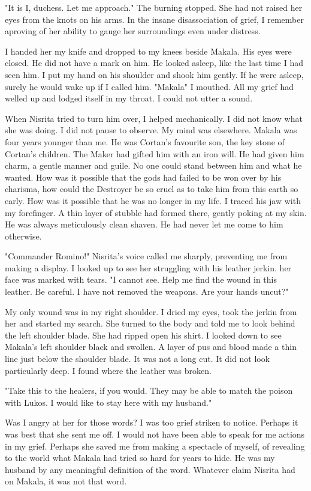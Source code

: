\documentclass{article}
\begin{document}
"It is I, duchess. Let me approach." The burning stopped. She had not raised her eyes from the knots on his arms. In the insane disassociation of grief, I remember aproving of her ability to gauge her surroundings even under distress. 

I handed her my knife and dropped to my knees beside Makala. His eyes were closed. He did not have a mark on him. He looked asleep, like the last time I had seen him. I put my hand on his shoulder and shook him gently. If he were asleep, surely he would wake up if I called him. "Makala" I mouthed. All my grief had welled up and lodged itself in my throat. I could not utter a sound. 

When Nisrita tried to turn him over, I helped mechanically. I did not know what she was doing. I did not pause to observe. My mind was elsewhere. Makala was four years younger than me. He was Cortan's favourite son, the key stone of Cortan's children. The Maker had gifted him with an iron will. He had given him charm, a gentle manner and guile. No one could stand between him and what he wanted. How was it possible that the gods had failed to be won over by his charisma, how could the Destroyer be so cruel as to take him from this earth so early. How was it possible that he was no longer in my life. 
I traced his jaw with my forefinger. A thin layer of stubble had formed there, gently poking at my skin. He was always meticulously clean shaven. He had never let me come to him otherwise.

"Commander Romino!" Nisrita's voice called me sharply, preventing me from making a display. I looked up to see her struggling with his leather jerkin. her face was marked with tears. "I cannot see. Help me find the wound in this leather. Be careful. I have not removed the weapons. Are your hands uncut?"

My only wound was in my right shoulder. I dried my eyes, took the jerkin from her and started my search. She turned to the body and told me to look behind the left shoulder blade. She had ripped open his shirt. I looked down to see Makala's left shoulder black and swollen. A layer of pus and blood made a thin line just below the shoulder blade. It was not a long cut. It did not look particularly deep. I found where the leather was broken. 

"Take this to the healers, if you would. They may be able to match the poison with Lukos. I would like to stay here with my husband."

Was I angry at her for those words? I was too grief striken to notice. Perhaps it was best that she sent me off. I would not have been able to speak for me actions in my grief. Perhaps she saved me from making a spectacle of myself, of revealing to the world what Makala had tried so hard for years to hide. He was my husband by any meaningful definition of the word. Whatever claim Nisrita had on Makala, it was not that word.
\end{document}
